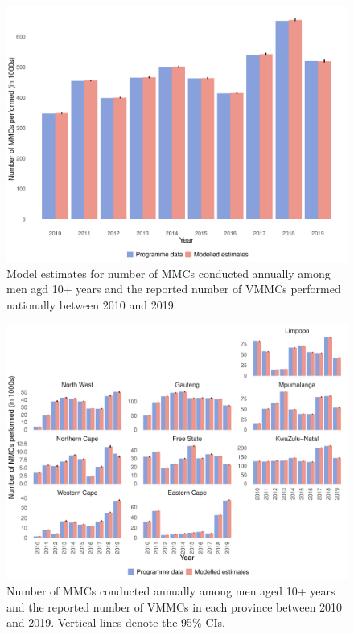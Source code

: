\documentclass{article}
\begin{document}
\begin{appendix}
\begin{figure}[H]
	\centering
	\includegraphics[width = \linewidth]{Figures/suppmat/VMMCs/MMCsComparison_National}
	\caption{Model estimates for number of MMCs conducted annually among men agd 10+ years and the reported number of VMMCs performed nationally between 2010 and 2019.}
\end{figure}


\begin{figure}[H]
	\centering
	\includegraphics[width = \linewidth]{Figures/suppmat/VMMCs/MMCsComparison_Province}
	\caption{Number of MMCs conducted annually among men aged 10+ years and the reported number of VMMCs  in each province between 2010 and 2019. Vertical lines denote the 95\% CIs.}
\end{figure}	


\end{appendix}
\end{document}
